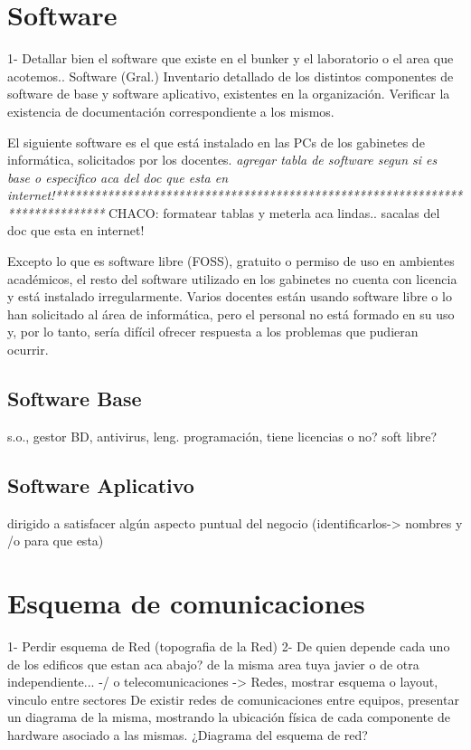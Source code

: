 \documentclass[10pt,a4paper,final]{article}
\begin{document}
\section{Software}
1- Detallar bien el software que existe en el bunker y el laboratorio o el area que acotemos..
Software (Gral.)
Inventario detallado de los distintos componentes de software de base y software aplicativo, existentes en la organización.
Verificar la existencia de documentación correspondiente a los mismos.


El siguiente software es el que está instalado en las PCs de los gabinetes de informática, solicitados por los docentes. 
\emph{agregar tabla de software segun si es base o especifico aca del doc que esta en internet!******************************************************************************}
CHACO: formatear tablas y meterla aca lindas.. sacalas del doc que esta en internet!

Excepto lo que es software libre (FOSS), gratuito o permiso de uso en ambientes académicos, el resto del software utilizado en los gabinetes no cuenta con licencia y está instalado irregularmente. Varios docentes están usando software libre o lo han solicitado al área de informática, pero el personal no está formado en su uso y, por lo tanto, sería difícil ofrecer respuesta a los problemas que pudieran ocurrir.
\subsection{Software Base}
s.o., gestor BD, antivirus, leng. programación, tiene licencias o no? soft libre?
\subsection{Software Aplicativo}
dirigido a satisfacer algún aspecto puntual del negocio (identificarlos-> nombres y /o para que esta)

\section{Esquema de comunicaciones}
1- Perdir esquema de Red (topografia de la Red)
2- De quien depende cada uno de los edificos que estan aca abajo? de la misma area tuya javier o de otra independiente...
-/ o telecomunicaciones -> Redes, mostrar esquema o layout, vinculo entre sectores
 De existir redes de comunicaciones entre equipos, presentar un diagrama de la misma, mostrando la ubicación física de cada componente de hardware asociado a las mismas.
¿Diagrama del esquema de red?
\end{document}
